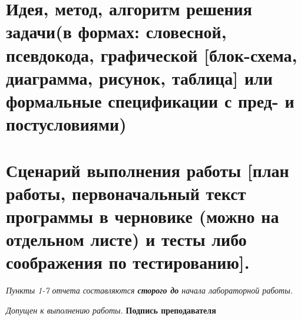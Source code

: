
\section{Идея, метод, алгоритм \textnormal{\small решения задачи(в формах: словесной, псевдокода, графической [блок-схема, диаграмма, рисунок, таблица] или формальные спецификации с пред- и постусловиями)}} \hfill

\vspace{0.4\textheight}

\section{Сценарий выполнения работы \textnormal{\small [план работы, первоначальный текст программы в черновике (можно на отдельном листе) и тесты либо соображения по тестированию].}} \hfill

\vspace{0.45\textheight}

\textit{Пункты 1-7 отчета составляются \textbf{сторого до} начала лабораторной работы.}

\begin{flushright}
  \textit{Допущен к выполнению работы.} \textbf{Подпись преподавателя} \uline{\hspace{3cm}}
\end{flushright}

\newpage